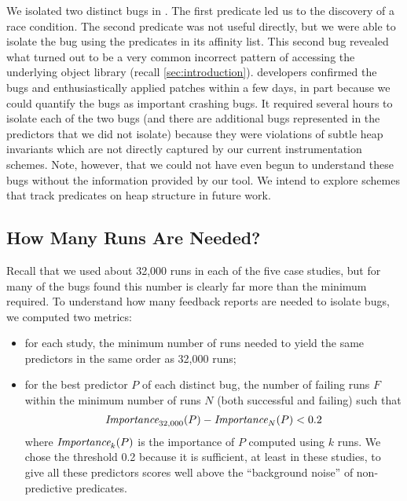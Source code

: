 We isolated two distinct bugs in \rhythmbox.  The first predicate led
us to the discovery of a race condition.  The second predicate was not
useful directly, but we were able to isolate the bug using the
predicates in its affinity list.  This second bug revealed what turned
out to be a very common incorrect pattern of accessing the underlying
object library (recall \autoref{sec:introduction}).  \rhythmbox
developers confirmed the bugs and enthusiastically applied patches
within a few days, in part because we could quantify the bugs as
important crashing bugs.  It required several hours to isolate each of
the two bugs (and there are additional bugs represented in the
predictors that we did not isolate) because they were violations of subtle heap
invariants which are not directly captured by our current
instrumentation schemes.  Note, however, that we could not have even
begun to understand these bugs without the information provided by our
tool.  We intend to explore schemes that track predicates on heap
structure in future work.

\subsection{How Many Runs Are Needed?}
\label{sec:numruns}



Recall that we used about 32,000 runs in each of the five case studies, but
for many of the bugs found this number is clearly far more than the minimum
required. To understand how many feedback reports are needed to isolate
bugs, we computed two metrics:
\begin{itemize}

\item for each study, the minimum number of runs needed 
to yield the same predictors in the same order as 32,000 runs;

\item for the best predictor $P$ of each distinct bug, the number of failing runs $F$ 
within the minimum number of runs $N$ (both successful and failing) such that
\[ \textit{Importance}_{32,000}(P) - \textit{Importance}_N(P) < 0.2 \]
where $\textit{Importance}_k(P)$ is the importance of $P$ computed using $k$
runs.  We chose the threshold 0.2 because it is sufficient, at least
in these studies, to give all these predictors scores well above the ``background
noise'' of non-predictive predicates.

\end{itemize}

